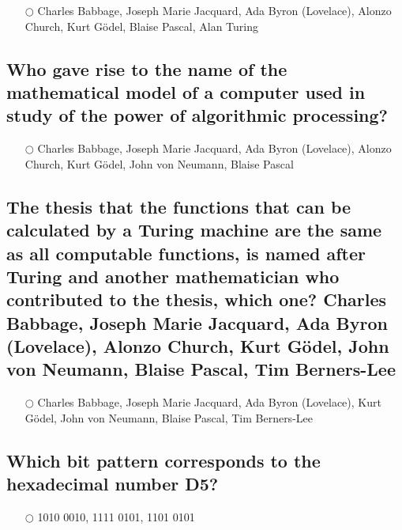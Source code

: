 \documentclass[a4paper,11pt,oneside]{article}
\begin{document}
\begin{sloppypar}
\label{q:440:mc:en:True}

\begin{itemize}
  \item[$\bigcirc$] Charles Babbage, Joseph Marie Jacquard, Ada Byron (Lovelace), Alonzo Church, Kurt G\"odel, Blaise Pascal, Alan Turing
\end{itemize}



\subsection{Who gave rise to the name of the mathematical model of a computer used in study of the power of algorithmic processing?}

\label{q:441:mc:en:True}

\begin{itemize}
  \item[$\bigcirc$] Charles Babbage, Joseph Marie Jacquard, Ada Byron (Lovelace), Alonzo Church, Kurt G\"odel, John von Neumann, Blaise Pascal
\end{itemize}



\subsection{The thesis that the functions that can be calculated by a Turing machine are the same as all computable functions, is named after Turing and another mathematician who contributed to the thesis, which one?  Charles Babbage, Joseph Marie Jacquard, Ada Byron (Lovelace), Alonzo Church, Kurt G\"odel, John von Neumann, Blaise Pascal, Tim Berners-Lee}

\label{q:442:mc:en:True}

\begin{itemize}
  \item[$\bigcirc$] Charles Babbage, Joseph Marie Jacquard, Ada Byron (Lovelace), Kurt G\"odel, John von Neumann, Blaise Pascal, Tim Berners-Lee
\end{itemize}



\subsection{Which bit pattern corresponds to the hexadecimal number D5?}

\label{q:443:mc:en:True}

\begin{itemize}
  \item[$\bigcirc$] 1010 0010, 1111 0101, 1101 0101
\end{itemize}




\end{sloppypar}
\end{document}

